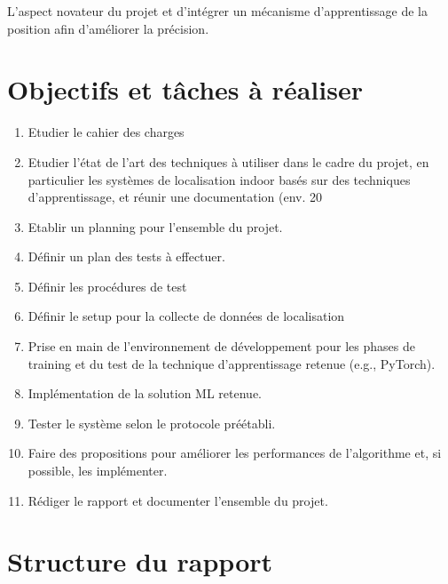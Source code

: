 L'aspect novateur du projet et d'intégrer un mécanisme d'apprentissage de la position afin d'améliorer la précision. 


\section{Objectifs et tâches à réaliser}
\begin{enumerate}
	\item Etudier le cahier des charges
	\item Etudier l’état de l’art des techniques à utiliser dans le cadre du projet, en particulier les systèmes de localisation indoor basés sur des techniques d’apprentissage, et réunir une documentation (env. 20%
	\item Etablir un planning pour l’ensemble du projet.
	\item Définir un plan des tests à effectuer.
	\item Définir les procédures de test
	\item Définir le setup pour la collecte de données de localisation
	\item Prise en main de l’environnement de développement pour les phases de training et du test de la technique d’apprentissage retenue (e.g., PyTorch).
	\item Implémentation de la solution ML retenue.
	\item Tester le système selon le protocole préétabli.
	\item Faire des propositions pour améliorer les performances de l’algorithme et, si possible, les implémenter.
	\item Rédiger le rapport et documenter l’ensemble du projet.
\end{enumerate}

\section{Structure du rapport}







